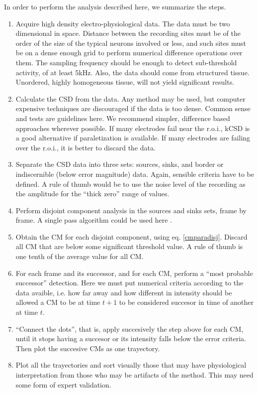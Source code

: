 \documentclass{article}
\begin{document}
 In order to perform the analysis described here, we summarize the steps.
 \begin{enumerate}
 \item Acquire high density electro-physiological data. The data must be two dimensional in space. Distance between the recording sites must be of the order of the size of the typical neurons involved or less, and such sites must be on a dense enough grid to perform numerical difference operations over them. The sampling frequency should be enough to detect sub-threshold activity, of at least 5kHz. Also, the data should come from structured tissue. Unordered, highly homogeneous tissue, will not yield significant results. 
 \item Calculate the CSD from the data. Any method may be used, but computer expensive techniques are discouraged if the data is too dense. Common sense and tests are guidelines here. We recommend simpler, difference based approaches wherever possible. If many electrodes fail near the r.o.i., kCSD is a good alternative if paraletization is available.  If many electrodes are failing over the r.o.i., it is better to discard the data. 
\item Separate the CSD data into three sets: sources, sinks, and border or indiscernible (below error magnitude) data. Again, sensible criteria have to be defined. A rule of thumb would be to use the noise level of the recording as the amplitude for the ``thick zero'' range of values. 
\item Perform disjoint component analysis in the sources and sinks sets, frame by frame.
  A single pass algorithm could be used here \cite{Vincent91, Abubaker07}.
\item  Obtain the CM for each disjoint component, using eq. \ref{cmparadisj}. Discard
  all CM that are below some significant threshold value. A rule of thumb is one tenth of the average value for all CM. 
\item For each frame and its successor, and for each CM, perform a ``most probable successor'' detection. Here we must put numerical criteria according to the data avaible, i.e. how far away and how different in intensity should be allowed a CM to be at time $t+1$ to be considered succesor in time of another at time $t$.
\item ``Connect the dots'', that is, apply succesively the step above for each CM, until it stops having a succesor or its intensity falls below the error criteria. Then plot the succesive CMs as one trayectory.
\item Plot all the trayectories and sort visually those that may have physiological interpretation from those who may be artifacts of the method. This may need some form of expert validation.
\end{enumerate}
\end{document}
